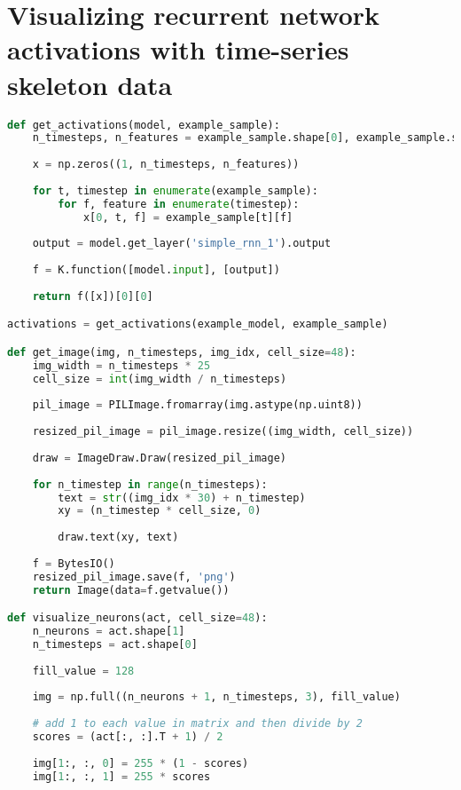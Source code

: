 \section{Visualizing recurrent network activations with time-series skeleton data}
\label{visualizing-recurrent-network-appendix}

\begin{lstlisting}[language=Python]
def get_activations(model, example_sample): 
    n_timesteps, n_features = example_sample.shape[0], example_sample.shape[1]
    
    x = np.zeros((1, n_timesteps, n_features))
    
    for t, timestep in enumerate(example_sample):
        for f, feature in enumerate(timestep):
            x[0, t, f] = example_sample[t][f]
                
    output = model.get_layer('simple_rnn_1').output
    
    f = K.function([model.input], [output])
    
    return f([x])[0][0]

activations = get_activations(example_model, example_sample)

def get_image(img, n_timesteps, img_idx, cell_size=48):
    img_width = n_timesteps * 25
    cell_size = int(img_width / n_timesteps)
    
    pil_image = PILImage.fromarray(img.astype(np.uint8))
    
    resized_pil_image = pil_image.resize((img_width, cell_size))
    
    draw = ImageDraw.Draw(resized_pil_image)
    
    for n_timestep in range(n_timesteps):
        text = str((img_idx * 30) + n_timestep)
        xy = (n_timestep * cell_size, 0)
        
        draw.text(xy, text)
        
    f = BytesIO()
    resized_pil_image.save(f, 'png')
    return Image(data=f.getvalue())

def visualize_neurons(act, cell_size=48):
    n_neurons = act.shape[1]
    n_timesteps = act.shape[0]
    
    fill_value = 128
    
    img = np.full((n_neurons + 1, n_timesteps, 3), fill_value)
    
    # add 1 to each value in matrix and then divide by 2
    scores = (act[:, :].T + 1) / 2
    
    img[1:, :, 0] = 255 * (1 - scores)
    img[1:, :, 1] = 255 * scores


\end{lstlisting}
